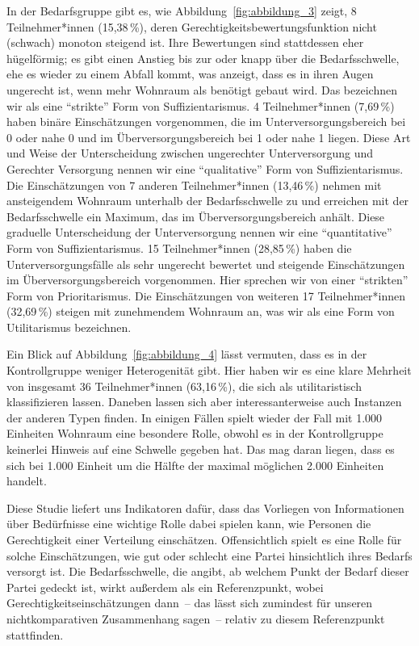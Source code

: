 \documentclass[justified,nobib,symmetric,twoside]{tufte-handout}
\begin{document}
In der Bedarfsgruppe gibt es, wie Abbildung~\ref{fig:abbildung_3} zeigt, 8 Teilnehmer*innen (15,38\,\%), deren Gerechtigkeitsbewertungsfunktion nicht (schwach) monoton steigend ist.
Ihre Bewertungen sind stattdessen eher hügelförmig; es gibt einen Anstieg bis zur oder knapp über die Bedarfsschwelle, ehe es wieder zu einem Abfall kommt, was anzeigt, dass es in ihren Augen ungerecht ist, wenn mehr Wohnraum als benötigt gebaut wird.
Das bezeichnen wir als eine \enquote{strikte} Form von Suffizientarismus.
4 Teilnehmer*innen (7,69\,\%) haben binäre Einschätzungen vorgenommen, die im Unterversorgungsbereich bei 0 oder nahe 0 und im Überversorgungsbereich bei 1 oder nahe 1 liegen.
Diese Art und Weise der Unterscheidung zwischen ungerechter Unterversorgung und Gerechter Versorgung nennen wir eine \enquote{qualitative} Form von Suffizientarismus.
Die Einschätzungen von 7 anderen Teilnehmer*innen (13,46\,\%) nehmen mit ansteigendem Wohnraum unterhalb der Bedarfsschwelle zu und erreichen mit der Bedarfsschwelle ein Maximum, das im Überversorgungsbereich anhält.
Diese graduelle Unterscheidung der Unterversorgung nennen wir eine \enquote{quantitative} Form von Suffizientarismus.
15 Teilnehmer*innen (28,85\,\%) haben die Unterversorgungsfälle als sehr ungerecht bewertet und steigende Einschätzungen im Überversorgungsbereich vorgenommen.
Hier sprechen wir von einer \enquote{strikten} Form von Prioritarismus.
Die Einschätzungen von weiteren 17 Teilnehmer*innen (32,69\,\%) steigen mit zunehmendem Wohnraum an, was wir als eine Form von Utilitarismus bezeichnen.

Ein Blick auf Abbildung~\ref{fig:abbildung_4} lässt vermuten, dass es in der Kontrollgruppe weniger Heterogenität gibt.
Hier haben wir es eine klare Mehrheit von insgesamt 36 Teilnehmer*innen (63,16\,\%), die sich als utilitaristisch klassifizieren lassen.
Daneben lassen sich aber interessanterweise auch Instanzen der anderen Typen finden.
In einigen Fällen spielt wieder der Fall mit 1.000 Einheiten Wohnraum eine besondere Rolle, obwohl es in der Kontrollgruppe keinerlei Hinweis auf eine Schwelle gegeben hat.
Das mag daran liegen, dass es sich bei 1.000 Einheit um die Hälfte der maximal möglichen 2.000 Einheiten handelt.

Diese Studie liefert uns Indikatoren dafür, dass das Vorliegen von Informationen über Bedürfnisse eine wichtige Rolle dabei spielen kann, wie Personen die Gerechtigkeit einer Verteilung einschätzen.
Offensichtlich spielt es eine Rolle für solche Einschätzungen, wie gut oder schlecht eine Partei hinsichtlich ihres Bedarfs versorgt ist.
Die Bedarfsschwelle, die angibt, ab welchem Punkt der Bedarf dieser Partei gedeckt ist, wirkt außerdem als ein Referenzpunkt, wobei Gerechtigkeitseinschätzungen dann~-- das lässt sich zumindest für unseren nichtkomparativen Zusammenhang sagen~-- relativ zu diesem Referenzpunkt stattfinden.
\end{document}
